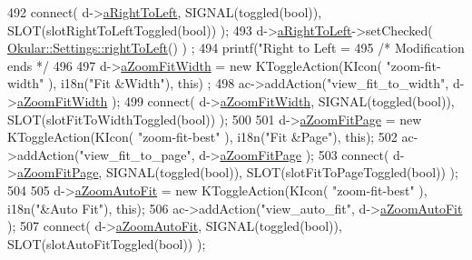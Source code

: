 \begin{DoxyCode}
492     connect( d->\hyperlink{classPageViewPrivate_a4f801cbeb2d2c5bb5cccd84f373aeec9}{aRightToLeft}, SIGNAL(toggled(\textcolor{keywordtype}{bool})), SLOT(slotRightToLeftToggled(\textcolor{keywordtype}{bool})) );
493     d->\hyperlink{classPageViewPrivate_a4f801cbeb2d2c5bb5cccd84f373aeec9}{aRightToLeft}->setChecked( \hyperlink{classOkular_1_1Settings_a809dd5c4f2d3fc1cf85f6852ff264611}{Okular::Settings::rightToLeft}() )
      ;
494     printf(\textcolor{stringliteral}{"Right to Left = %
495     \textcolor{comment}{/* Modification ends                                 */}
496 
497     d->\hyperlink{classPageViewPrivate_a251dae24330598db9ee9b7eb6015be3b}{aZoomFitWidth}  = \textcolor{keyword}{new} KToggleAction(KIcon( \textcolor{stringliteral}{"zoom-fit-width"} ), i18n(\textcolor{stringliteral}{"Fit &Width"}), \textcolor{keyword}{this})
      ;
498     ac->addAction(\textcolor{stringliteral}{"view\_fit\_to\_width"}, d->\hyperlink{classPageViewPrivate_a251dae24330598db9ee9b7eb6015be3b}{aZoomFitWidth} );
499     connect( d->\hyperlink{classPageViewPrivate_a251dae24330598db9ee9b7eb6015be3b}{aZoomFitWidth}, SIGNAL(toggled(\textcolor{keywordtype}{bool})), SLOT(slotFitToWidthToggled(\textcolor{keywordtype}{bool})) );
500 
501     d->\hyperlink{classPageViewPrivate_a821a7981295e5366b2f3d489b501ae37}{aZoomFitPage}  = \textcolor{keyword}{new} KToggleAction(KIcon( \textcolor{stringliteral}{"zoom-fit-best"} ), i18n(\textcolor{stringliteral}{"Fit &Page"}), \textcolor{keyword}{this});
502     ac->addAction(\textcolor{stringliteral}{"view\_fit\_to\_page"}, d->\hyperlink{classPageViewPrivate_a821a7981295e5366b2f3d489b501ae37}{aZoomFitPage} );
503     connect( d->\hyperlink{classPageViewPrivate_a821a7981295e5366b2f3d489b501ae37}{aZoomFitPage}, SIGNAL(toggled(\textcolor{keywordtype}{bool})), SLOT(slotFitToPageToggled(\textcolor{keywordtype}{bool})) );
504 
505     d->\hyperlink{classPageViewPrivate_ad119458f9f75be63ae18c65e86ded044}{aZoomAutoFit}  = \textcolor{keyword}{new} KToggleAction(KIcon( \textcolor{stringliteral}{"zoom-fit-best"} ), i18n(\textcolor{stringliteral}{"&Auto Fit"}), \textcolor{keyword}{this});
506     ac->addAction(\textcolor{stringliteral}{"view\_auto\_fit"}, d->\hyperlink{classPageViewPrivate_ad119458f9f75be63ae18c65e86ded044}{aZoomAutoFit} );
507     connect( d->\hyperlink{classPageViewPrivate_ad119458f9f75be63ae18c65e86ded044}{aZoomAutoFit}, SIGNAL(toggled(\textcolor{keywordtype}{bool})), SLOT(slotAutoFitToggled(\textcolor{keywordtype}{bool})) );
}
\end{DoxyCode}

